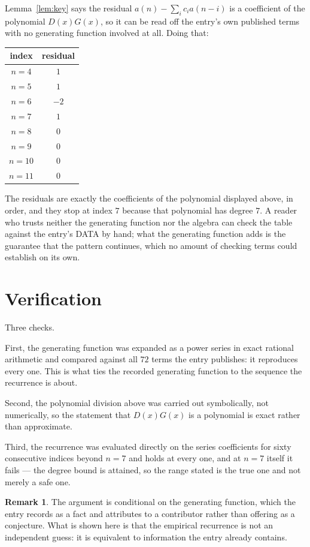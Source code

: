 \documentclass[11pt,a4paper]{article}
\theoremstyle{plain}
\theoremstyle{definition}
\newtheorem{remark}[theorem]{Remark}
\begin{document}
Lemma~\ref{lem:key} says the residual $a(n)-\sum_ic_ia(n-i)$ is a coefficient of the
polynomial $D(x)G(x)$, so it can be read off the entry's own published terms with no
generating function involved at all. Doing that:
\begin{center}
\begin{tabular}{cc}
index & residual \\ \hline
$n=4$ & $1$ \\
$n=5$ & $1$ \\
$n=6$ & $-2$ \\
$n=7$ & $1$ \\
$n=8$ & $0$ \\
$n=9$ & $0$ \\
$n=10$ & $0$ \\
$n=11$ & $0$
\end{tabular}
\end{center}
The residuals are exactly the coefficients of the polynomial displayed above, in order, and
they stop at index $7$ because that polynomial has degree $7$. A reader who trusts
neither the generating function nor the algebra can check the table against the entry's DATA
by hand; what the generating function adds is the guarantee that the pattern continues, which
no amount of checking terms could establish on its own.

\section{Verification}

Three checks.

First, the generating function was expanded as a power series in exact rational arithmetic and
compared against all $72$ terms the entry publishes: it reproduces every one. This is
what ties the recorded generating function to the sequence the recurrence is about.

Second, the polynomial division above was carried out symbolically, not numerically, so the
statement that $D(x)G(x)$ is a polynomial is exact rather than approximate.

Third, the recurrence was evaluated directly on the series coefficients for sixty consecutive
indices beyond $n=7$ and holds at every one, and at $n=7$ itself it fails --- the
degree bound is attained, so the range stated is the true one and not merely a safe one.

\begin{remark}
The argument is conditional on the generating function, which the entry records as a fact and
attributes to a contributor rather than offering as a conjecture. What is shown here is that
the empirical recurrence is not an independent guess: it is equivalent to information the
entry already contains.
\end{remark}
\end{document}
